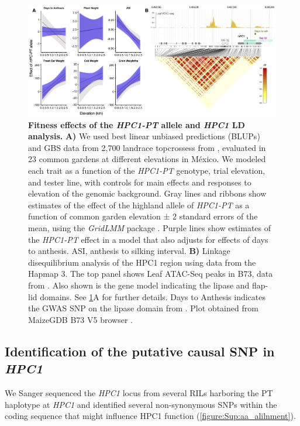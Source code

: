 \documentclass[9pt,twocolumn,twoside,lineno]{biorxiv}
\newcommand{\hpc}{\textit{HPC1}\xspace}
\begin{document}
\begin{figure}[htp]
\centering
\includegraphics[width=0.8\paperwidth]{Figures/Fig_5.png}
\caption{\textbf{Fitness effects of the \textit{HPC1-PT} allele and \hpc LD analysis.} \textbf{A)}
We used best linear unbiased predictions (BLUPs) and GBS data from 2,700 landrace topcrossess from \cite{Gates2019-xu}, evaluated in 23 common gardens at different elevations in M\'exico. 
We modeled each trait as a function of the \textit{HPC1-PT} genotype, trial elevation, and tester line, with controls for main effects and responses to elevation of the genomic background. 
Gray lines and ribbons show estimates of the effect of the highland allele of \textit{HPC1-PT} as a function of common garden elevation ± 2 standard errors of the mean, using the \textit{GridLMM} package \cite{Runcie2019-Gr}. 
Purple lines show estimates of the \textit{HPC1-PT} effect in a model that also adjusts for effects of days to anthesis. ASI, anthesis to silking interval. 
\textbf{B)} Linkage disequilibrium analysis of the HPC1 region using data from the Hapmap 3. 
The top panel shows Leaf ATAC-Seq peaks in B73, data from  \cite{Ricci2019-zj}.
Also shown is the  gene model indicating the lipase and flap-lid domains. 
See \ref{Fig5}A for further details.
Days to Anthesis indicates the GWAS SNP on the lipase domain from \cite{Wallace2014-yy}. 
Plot obtained from MaizeGDB B73 V5 browser \cite{Woodhouse2021-wd}.}
\label{Fig5}
\end{figure}
\subsection{Identification of the putative causal SNP in \hpc}
We Sanger sequenced the \hpc locus from several RILs harboring the PT haplotype at \hpc and identified several non-synonymous SNPs within the coding sequence that might influence HPC1 function (\cref{figure:Sup:aa_alilnment}).
\end{document}
